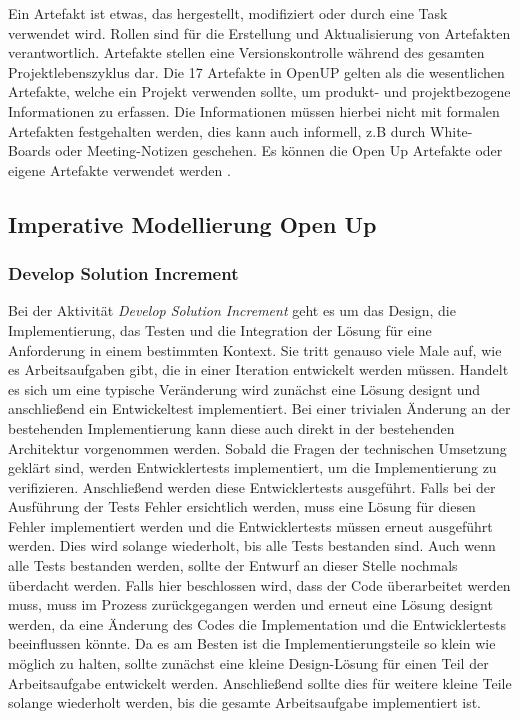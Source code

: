 Ein Artefakt ist etwas, das hergestellt, modifiziert oder durch eine Task verwendet wird. Rollen sind 
für die Erstellung und Aktualisierung von Artefakten verantwortlich. Artefakte stellen eine Versionskontrolle während des gesamten Projektlebenszyklus dar. Die 17 Artefakte in OpenUP gelten als die wesentlichen Artefakte, welche ein Projekt verwenden sollte, um produkt- und projektbezogene Informationen zu erfassen. Die Informationen müssen hierbei nicht mit formalen Artefakten festgehalten werden, dies kann auch informell, z.B durch White-Boards oder Meeting-Notizen geschehen. Es können die Open Up Artefakte oder eigene Artefakte verwendet werden \cite{eclipseopenup}.

\subsection{Imperative Modellierung Open Up}

\subsubsection{Develop Solution Increment}

 Bei der Aktivität \textit{Develop Solution Increment} geht es um das Design, die Implementierung, das Testen und die Integration der Lösung für eine Anforderung in einem bestimmten Kontext. Sie tritt genauso viele Male auf, wie es Arbeitsaufgaben gibt, die in einer Iteration entwickelt werden müssen.
 Handelt es sich um eine typische Veränderung wird zunächst eine Lösung designt und anschließend ein Entwickeltest implementiert. Bei einer trivialen Änderung an der bestehenden Implementierung kann diese auch direkt in der bestehenden Architektur vorgenommen werden. \newline
 Sobald die Fragen der technischen Umsetzung geklärt sind, werden Entwicklertests implementiert, um die Implementierung zu verifizieren. Anschließend werden diese Entwicklertests ausgeführt.\newline
 Falls bei der Ausführung der Tests Fehler ersichtlich werden, muss eine Lösung für diesen Fehler implementiert werden und die Entwicklertests müssen erneut ausgeführt werden. Dies wird solange wiederholt, bis alle Tests bestanden sind.\newline
 Auch wenn alle Tests bestanden werden, sollte der Entwurf an dieser Stelle nochmals überdacht werden. Falls hier beschlossen wird, dass der Code überarbeitet werden muss, muss im Prozess zurückgegangen werden und erneut eine Lösung designt werden, da eine Änderung des Codes die Implementation und die Entwicklertests beeinflussen könnte.\newline
 Da es am Besten ist die Implementierungsteile so klein wie möglich zu halten, sollte zunächst eine kleine Design-Lösung für einen Teil der Arbeitsaufgabe entwickelt werden. Anschließend sollte dies für weitere kleine Teile solange wiederholt werden, bis die gesamte Arbeitsaufgabe implementiert ist. \newline
 
